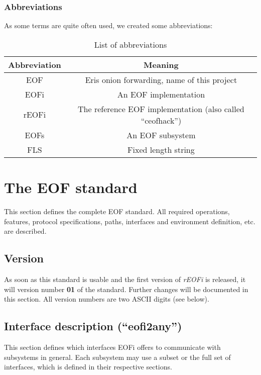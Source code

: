 \documentclass[12pt,a4paper]{book}
\begin{document}
\subsection{Abbreviations}
As some terms are quite often used, we created some abbreviations:
%
%
%
%
%
%
\begin{longtable}{|c|c|}
\caption{List of abbreviations}\\
\hline
\textbf{Abbreviation} & \textbf{Meaning}\\
\hline
EOF & Eris onion forwarding, name of this project\\
\hline
EOFi & An EOF implementation\\
\hline
rEOFi & The reference EOF implementation (also called "`ceofhack"')\\
\hline
EOFs & An EOF subsystem\\
\hline
FLS & Fixed length string\\
\hline
\end{longtable}
\chapter{The EOF standard}
This section defines the complete EOF standard. All required operations,
features, protocol specifications, paths, interfaces and environment definition,
etc. are described.
\section{Version}
As soon as this standard is usable and the first version of \emph{rEOFi}
is released, it will version number \textbf{01} of the standard.
Further changes will be documented in this section. All version numbers
are two ASCII digits (see below).
\section{Interface description ("`eofi2any"')}
This section defines which interfaces EOFi offers to communicate with
subsystems in general. Each subsystem may use a subset or the full set
of interfaces, which is defined in their respective sections.
\end{document}
